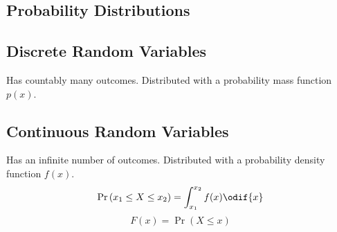 \documentclass{article}
\begin{document}
\begin{minipage}{126.1962963mm}
    \begin{multicols}{2}
        \section*{Probability Distributions}
        \subsection*{Discrete Random Variables}
        Has countably many outcomes. Distributed with a
        probability mass function \(p(x)\).
        \subsection*{Continuous Random Variables}
        Has an infinite number of outcomes. Distributed with a
        probability density function \(f(x)\).
        \begin{equation*}
            \Pr{\left( x_1 \leq X \leq x_2 \right)} = \int_{x_1}^{x_2} f(x) \odif{x}
        \end{equation*}
        \begin{equation*}
            F(x) = \Pr{\left( X \leq x \right)}
        \end{equation*}

\end{multicols}
\end{minipage}
\end{document}
